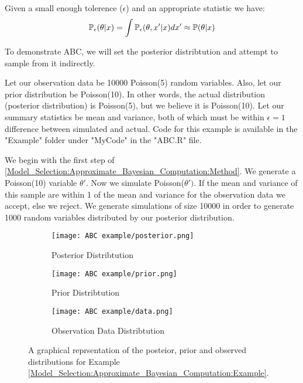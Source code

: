 Given a small enough tolerence ($\epsilon$) and an appropriate statistic we have:
\begin{equation}
    \label{Model_Selection:Approximate_Bayesian_Computation:posterior_convergence}
    \mathbb{P}_{\epsilon}(\theta|x) = \int \mathbb{P}_{\epsilon}(\theta, x'|x)dx' \approx \mathbb{P}(\theta|x)
\end{equation}

\begin{example}
    \label{Model_Selection:Approximate_Bayesian_Computation:Example}
    To demonstrate ABC, we will set the posterior distribtution and attempt to sample from it indirectly.

    Let our observation data be 10000 Poisson(5) random variables. Also, let our prior distribution be Poisson(10). In other words, the actual distribution (posterior distribution) is Poisson(5), but we believe it is Poisson(10). Let our summary statistics be mean and variance, both of which must be within $\epsilon =1$ difference between simulated and actual. Code for this example is available in the "Example" folder under "MyCode" in the "ABC.R" file.

    We begin with the first step of \ref{Model_Selection:Approximate_Bayesian_Computation:Method}. We generate a Poisson(10) variable $\theta'$. Now we simulate Poisson($\theta')$. If the mean and variance of this sample are within 1 of the mean and variance for the observation data we accept, else we reject. We generate simulations of size 10000 in order to generate 1000 random variables distributed by our posterior distribution. 

    \begin{figure}
        \centering
        \begin{subfigure}{.45\textwidth}
            \centering
            \texttt{[image: ABC example/posterior.png]}
            \caption{Posterior Distribtution}
            \label{Model_Selection:Approximate_Bayesian_Computation:Example_Figure:1}
        \end{subfigure}
        \begin{subfigure}{.45\textwidth}
            \centering
            \texttt{[image: ABC example/prior.png]}
            \caption{Prior Distribtution}
            \label{Model_Selection:Approximate_Bayesian_Computation:Example_Figure:2}
        \end{subfigure}    

        \begin{subfigure}{.45\textwidth}
            \centering
            \texttt{[image: ABC example/data.png]}
            \caption{Observation Data Distribtution }
            \label{Model_Selection:Approximate_Bayesian_Computation:Example_Figure:3}
        \end{subfigure}
        \caption{A graphical reprsentation of the posteior, prior and observed distributions for Example \ref{Model_Selection:Approximate_Bayesian_Computation:Example}.}
        \label{Model_Selection:Approximate_Bayesian_Computation:Example_Figure}
    \end{figure} 


\end{example}
